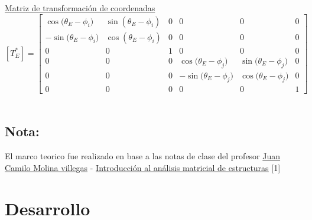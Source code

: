 \documentclass[a4paper]{article}
\begin{document}
\underline{Matriz de transformación de coordenadas}
{
\renewcommand{\arraystretch}{1.5}
$$
[T^*_E]=
\left[
\begin{array}{cccccc}
    {\cos{({\theta}_E - {\phi}_i })} & {\sin{({\theta}_E - {\phi}_i )}} & 0 & 0 & 0 &  0 \\
    -{\sin{({\theta}_E - {\phi}_i })} & {\cos{({\theta}_E - {\phi}_i) }} & 0 & 0 & 0 &  0 \\
     0 & 0 & 1 & 0 & 0 &  0 \\
     0 & 0 & 0 & {\cos{({\theta}_E - {\phi}_j })} & {\sin{({\theta}_E - {\phi}_j })} &  0 \\
     0 & 0 & 0 & -{\sin{({\theta}_E - {\phi}_j })} & {\cos{({\theta}_E - {\phi}_j })} &  0 \\
     0 & 0 & 0 & 0 & 0 &  1  
\end{array}
\right]
$$
}
\\
\medskip



\subsection*{Nota:}
El marco teorico fue realizado en base a las notas de clase del  profesor \href{https://www.researchgate.net/profile/Juan_Molina_Villegas}{Juan Camilo Molina villegas} -  \underline{\href{https://www.researchgate.net/publication/330567201_Introduccion_al_analisis_matricial_de_estructuras}{Introducción al análisis matricial de estructuras}} [1]
\vspace{0.5cm}

\section{Desarrollo}
\end{document}
